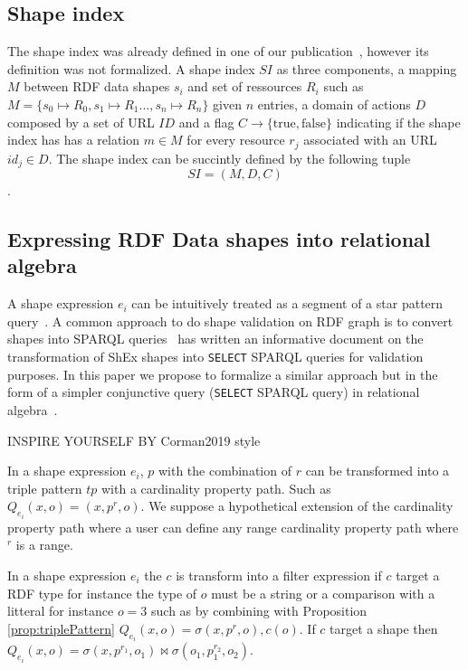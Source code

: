 \fi

\subsection{Shape index}
The shape index was already defined in one of our publication~\cite{tam2024opportunitiesshapebasedoptimizationlink}, however its definition was not formalized.
A shape index $SI$ as three components, a mapping $M$ between RDF data shapes $s_i$ and set of ressources $R_i$ such as $M = \{s_0 \mapsto R_0, s_1 \mapsto R_1..., s_n \mapsto R_n\}$ given $n$ entries,
a domain of actions $D$ composed by a set of URL $ID$ and
a flag $C\rightarrow \{\mathrm{true}, \mathrm{false}\}$ indicating if the shape index has has a relation $m \in M$ for every resource $r_j$ associated with an URL $id_j \in D$. 
The shape index can be succintly defined by the following tuple 
\begin{equation}
SI = (M, D, C)
\end{equation}.

\subsection{Expressing RDF Data shapes into relational algebra}
A shape expression $e_i$ can be intuitively treated as a segment of a star pattern query~\cite{delva2023}.
A common approach to do shape validation on RDF graph is to convert shapes into SPARQL queries~\cite{labragayo2017validatingdescribinglinkeddata, Corman2019, spapeExpressionConvert}
\citeauthor{spapeExpressionConvert} has written an informative document on the transformation of ShEx shapes into
\texttt{SELECT} SPARQL queries for validation purposes. 
In this paper we propose to formalize a similar approach but in the form of a simpler conjunctive query (\texttt{SELECT} SPARQL query) in relational algebra~\cite{cyganiak2005relational, Angles2008}.

INSPIRE YOURSELF BY Corman2019 style

\begin{prop}\label{prop:triplePattern}
   In a shape expression $e_i$, $p$ with the combination of $r$ can be transformed into a triple pattern $tp$ with a cardinality property path.
   Such as $Q_{e_i}(x,o) = (x, p^r, o)$. 
   We suppose a hypothetical extension of the cardinality property path where a user can define any range cardinality property path where $^r$ is a range.
\end{prop}

\begin{prop}
   In a shape expression $e_i$ the $c$ is transform into a filter expression if $c$ target a RDF type for instance the type of $o$ must be a string or
   a comparison with a litteral for instance $o=3$ such as by combining with Proposition \ref{prop:triplePattern} $Q_{e_i}(x,o) = \sigma(x, p^r, o), c(o)$.
   If $c$ target a shape then $Q_{e_i}(x,o) = \sigma(x, p^{r_{1}}, o_1) \bowtie \sigma(o_1, p_1^{r_2}, o_2)$.
\end{prop}

